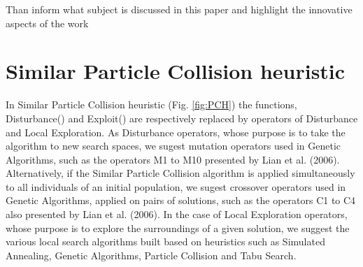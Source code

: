 Than inform what subject is discussed in this paper and highlight the innovative aspects of the work

\section{Similar Particle Collision heuristic}
\label{sec:SPC}

In Similar Particle Collision heuristic (Fig. \ref{fig:PCH}) the functions, Disturbance() and Exploit() are respectively replaced by operators of Disturbance and Local Exploration. As Disturbance operators, whose purpose is to take the algorithm to new search spaces, we sugest mutation operators used in Genetic Algorithms, such as the operators M1 to M10 presented by Lian et al. (2006). Alternatively, if the Similar Particle Collision algorithm is applied simultaneously to all individuals of an initial population, we sugest crossover operators used in Genetic Algorithms, applied on pairs of solutions, such as the operators C1 to C4 also presented by Lian et al. (2006). In the case of Local Exploration operators, whose purpose is to explore the surroundings of a given solution, we suggest the various local search algorithms built based on heuristics such as Simulated Annealing, Genetic Algorithms, Particle Collision and Tabu Search. \\

